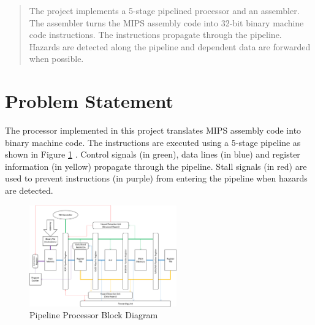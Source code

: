 \documentclass[conference]{IEEEtran}
\begin{document}




\maketitle


\begin{abstract}
The project implements a 5-stage pipelined processor and an assembler. The assembler turns the MIPS assembly code into 32-bit binary machine code instructions. The instructions propagate through the pipeline. Hazards are detected along the pipeline and dependent data are forwarded when possible.
\end{abstract}





%
\IEEEpeerreviewmaketitle



\section{Problem Statement}

The processor implemented in this project translates MIPS assembly code into binary machine code. The instructions are executed using a 5-stage pipeline as shown in Figure \ref{pipelineBD} \cite{compOrg}. Control signals (in green), data lines (in blue) and register information (in yellow) propagate through the pipeline. Stall signals (in red) are used to prevent instructions (in purple) from entering the pipeline when hazards are detected.

\begin{figure}[!h]
\centering
\includegraphics[width=2.5in]{Figures/pipeline}
\caption{Pipeline Processor Block Diagram}
\label{pipelineBD}
\end{figure}
\end{document}
